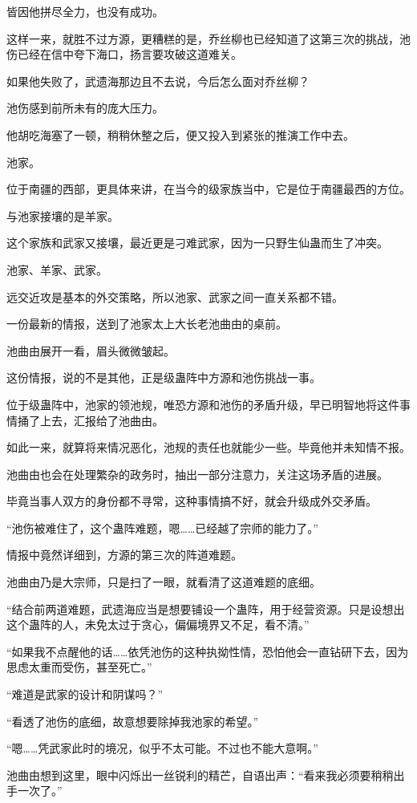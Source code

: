 \begin{this_body}
皆因他拼尽全力，也没有成功。

这样一来，就胜不过方源，更糟糕的是，乔丝柳也已经知道了这第三次的挑战，池伤已经在信中夸下海口，扬言要攻破这道难关。

如果他失败了，武遗海那边且不去说，今后怎么面对乔丝柳？

池伤感到前所未有的庞大压力。

他胡吃海塞了一顿，稍稍休整之后，便又投入到紧张的推演工作中去。

池家。

位于南疆的西部，更具体来讲，在当今的级家族当中，它是位于南疆最西的方位。

与池家接壤的是羊家。

这个家族和武家又接壤，最近更是刁难武家，因为一只野生仙蛊而生了冲突。

池家、羊家、武家。

远交近攻是基本的外交策略，所以池家、武家之间一直关系都不错。

一份最新的情报，送到了池家太上大长老池曲由的桌前。

池曲由展开一看，眉头微微皱起。

这份情报，说的不是其他，正是级蛊阵中方源和池伤挑战一事。

位于级蛊阵中，池家的领池规，唯恐方源和池伤的矛盾升级，早已明智地将这件事情捅了上去，汇报给了池曲由。

如此一来，就算将来情况恶化，池规的责任也就能少一些。毕竟他并未知情不报。

池曲由也会在处理繁杂的政务时，抽出一部分注意力，关注这场矛盾的进展。

毕竟当事人双方的身份都不寻常，这种事情搞不好，就会升级成外交矛盾。

“池伤被难住了，这个蛊阵难题，嗯……已经越了宗师的能力了。”

情报中竟然详细到，方源的第三次的阵道难题。

池曲由乃是大宗师，只是扫了一眼，就看清了这道难题的底细。

“结合前两道难题，武遗海应当是想要铺设一个蛊阵，用于经营资源。只是设想出这个蛊阵的人，未免太过于贪心，偏偏境界又不足，看不清。”

“如果我不点醒他的话……依凭池伤的这种执拗性情，恐怕他会一直钻研下去，因为思虑太重而受伤，甚至死亡。”

“难道是武家的设计和阴谋吗？”

“看透了池伤的底细，故意想要除掉我池家的希望。”

“嗯……凭武家此时的境况，似乎不太可能。不过也不能大意啊。”

池曲由想到这里，眼中闪烁出一丝锐利的精芒，自语出声：“看来我必须要稍稍出手一次了。”


\end{this_body}
